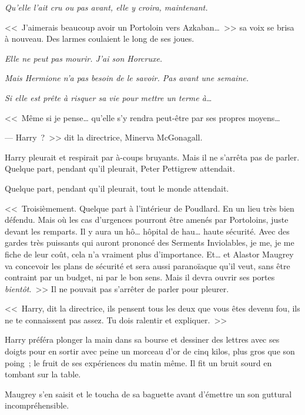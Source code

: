 \emph{Qu'elle l'ait cru ou pas avant, elle y croira, maintenant.}

<<~J'aimerais beaucoup avoir un Portoloin vers Azkaban…~>> sa voix se brisa à nouveau. Des larmes coulaient le long de ses joues.

\emph{Elle ne peut pas mourir. J'ai son Horcruxe.}

\emph{Mais Hermione n'a pas besoin de le savoir. Pas avant une semaine.}

\emph{Si elle est prête à risquer sa vie pour mettre un terme à…}

<<~Même si je pense… qu'elle s'y rendra peut-être par ses propres moyens…

--- Harry~?~>> dit la directrice, Minerva McGonagall.

Harry pleurait et respirait par à-coups bruyants. Mais il ne s'arrêta pas de parler. Quelque part, pendant qu'il pleurait, Peter Pettigrew attendait.

Quelque part, pendant qu'il pleurait, tout le monde attendait.

<<~Troisièmement. Quelque part à l'intérieur de Poudlard. En un lieu très bien défendu. Mais où les cas d'urgences pourront être amenés par Portoloins, juste devant les remparts. Il y aura un hô… hôpital de hau… haute sécurité. Avec des gardes très puissants qui auront prononcé des Serments Inviolables, je me, je me fiche de leur coût, cela n'a vraiment plus d'importance. Et… et Alastor Maugrey va concevoir les plans de sécurité et sera aussi paranoïaque qu'il veut, sans être contraint par un budget, ni par le bon sens. Mais il devra ouvrir ses portes \emph{bientôt}.~>> Il ne pouvait pas s'arrêter de parler pour pleurer.

<<~Harry, dit la directrice, ils pensent tous les deux que vous êtes devenu fou, ils ne te connaissent pas assez. Tu dois ralentir et expliquer.~>>

Harry préféra plonger la main dans sa bourse et dessiner des lettres avec ses doigts pour en sortir avec peine un morceau d'or de cinq kilos, plus gros que son poing~; le fruit de ses expériences du matin même. Il fit un bruit sourd en tombant sur la table.

Maugrey s'en saisit et le toucha de sa baguette avant d'émettre un son guttural incompréhensible.


